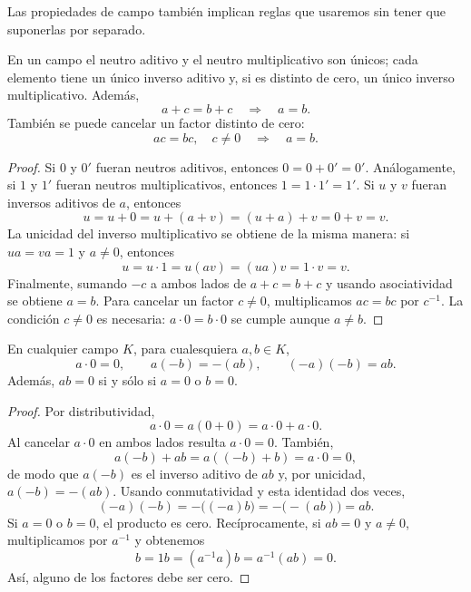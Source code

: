 Las propiedades de campo también implican reglas que usaremos sin tener que suponerlas por separado.

\begin{samepage}
\begin{proposition}
\label{prop:cancelacion-campo}
En un campo el neutro aditivo y el neutro multiplicativo son únicos; cada elemento tiene un único inverso aditivo y, si es distinto de cero, un único inverso multiplicativo. Además,
\[
a+c=b+c\quad\Longrightarrow\quad a=b.
\]
También se puede cancelar un factor distinto de cero:
\[
ac=bc,\quad c\neq0\quad\Longrightarrow\quad a=b.
\]
\end{proposition}
\end{samepage}

\begin{proof}
Si $0$ y $0'$ fueran neutros aditivos, entonces $0=0+0'=0'$. Análogamente, si $1$ y $1'$ fueran neutros multiplicativos, entonces $1=1\cdot1'=1'$. Si $u$ y $v$ fueran inversos aditivos de $a$, entonces
\[
u=u+0=u+(a+v)=(u+a)+v=0+v=v.
\]
La unicidad del inverso multiplicativo se obtiene de la misma manera: si $u a=v a=1$ y $a\ne0$, entonces
\[
u=u\cdot1=u(av)=(ua)v=1\cdot v=v.
\]
Finalmente, sumando $-c$ a ambos lados de $a+c=b+c$ y usando asociatividad se obtiene $a=b$.
Para cancelar un factor $c\neq0$, multiplicamos $ac=bc$ por $c^{-1}$. La condición $c\neq0$ es necesaria: $a\cdot0=b\cdot0$ se cumple aunque $a\neq b$.
\end{proof}

\begin{samepage}
\begin{proposition}
\label{prop:cero-signos}
En cualquier campo $K$, para cualesquiera $a,b\in K$,
\[
a\cdot0=0,\qquad a(-b)=-(ab),\qquad (-a)(-b)=ab.
\]
Además, $ab=0$ si y sólo si $a=0$ o $b=0$.
\end{proposition}
\end{samepage}

\begin{proof}
Por distributividad,
\[
a\cdot0=a(0+0)=a\cdot0+a\cdot0.
\]
Al cancelar $a\cdot0$ en ambos lados resulta $a\cdot0=0$. También,
\[
a(-b)+ab=a((-b)+b)=a\cdot0=0,
\]
de modo que $a(-b)$ es el inverso aditivo de $ab$ y, por unicidad, $a(-b)=-(ab)$. Usando conmutatividad y esta identidad dos veces,
\[
(-a)(-b)=-\bigl((-a)b\bigr)=-\bigl(-(ab)\bigr)=ab.
\]
Si $a=0$ o $b=0$, el producto es cero. Recíprocamente, si $ab=0$ y $a\ne0$, multiplicamos por $a^{-1}$ y obtenemos
\[
b=1b=(a^{-1}a)b=a^{-1}(ab)=0.
\]
Así, alguno de los factores debe ser cero.
\end{proof}

